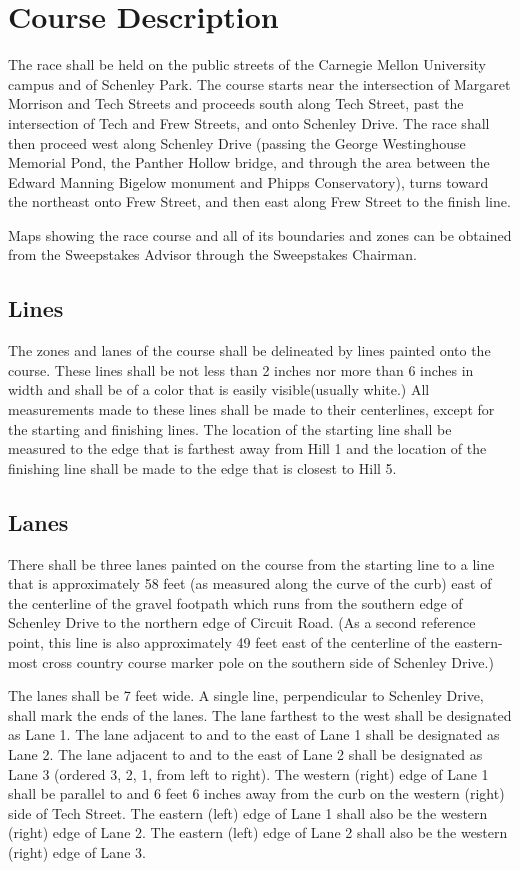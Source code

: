 \chapter{Course Description}

The race shall be held on the public streets of the Carnegie Mellon University campus and of Schenley Park. The course starts near the intersection of Margaret Morrison and Tech Streets and proceeds south along Tech Street, past the intersection of Tech and Frew Streets, and onto Schenley Drive. The race shall then proceed west along Schenley Drive (passing the George Westinghouse Memorial Pond, the Panther Hollow bridge, and through the area between the Edward Manning Bigelow monument and Phipps Conservatory), turns toward the northeast onto Frew Street, and then east along Frew Street to the finish line.

Maps showing the race course and all of its boundaries and zones can be obtained from the Sweepstakes Advisor through the Sweepstakes Chairman.

\section{Lines}

The zones and lanes of the course shall be delineated by lines painted onto the course. These lines shall be not less than 2 inches nor more than 6 inches in width and shall be of a color that is easily visible(usually white.) All measurements made to these lines shall be made to their centerlines, except for the starting and finishing lines. The location of the starting line shall be measured to the edge that is farthest away from Hill 1 and the location of the finishing line shall be made to the edge that is closest to Hill 5.

\section{Lanes}

There shall be three lanes painted on the course from the starting line to a line that is approximately 58 feet (as measured along the curve of the curb) east of the centerline of the gravel footpath which runs from the southern edge of Schenley Drive to the northern edge of Circuit Road. (As a second reference point, this line is also approximately 49 feet east of the centerline of the eastern-most cross country course marker pole on the southern side of Schenley Drive.)

The lanes shall be 7 feet wide. A single line, perpendicular to Schenley Drive, shall mark the ends of the lanes. The lane farthest to the west shall be designated as Lane 1. The lane adjacent to and to the east of Lane 1 shall be designated as Lane 2. The lane adjacent to and to the east of Lane 2 shall be designated as Lane 3 (ordered 3, 2, 1, from left to right). The western (right) edge of Lane 1 shall be parallel to and 6 feet 6 inches away from the curb on the western (right) side of Tech Street. The eastern (left) edge of Lane 1 shall also be the western (right) edge of Lane 2. The eastern (left) edge of Lane 2 shall also be the western (right) edge of Lane 3.


